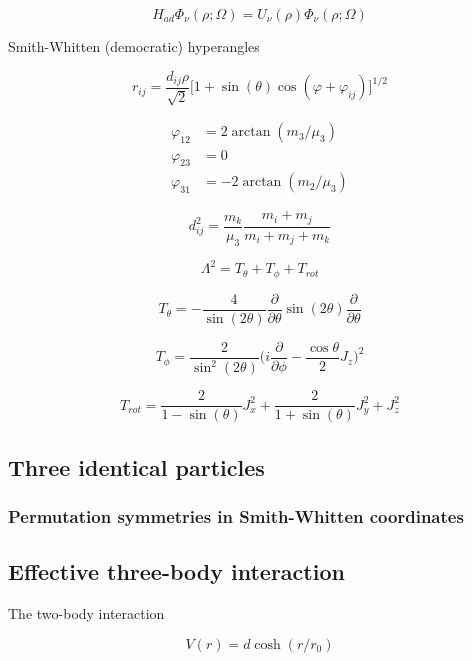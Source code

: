 \documentclass{article}
\begin{document}
\begin{equation}
H_{ad} \Phi_{\nu}{(\rho ; \Omega)}= U_{\nu}{(\rho)} \Phi_{\nu}{(\rho ; \Omega)}
\end{equation}


Smith-Whitten (democratic) hyperangles

\begin{equation}
r_{ij} = \frac{d_{ij} \rho}{\sqrt{2}} \Big[1+\sin(\theta) \cos{(\varphi + \varphi_{ij})}\Big]^{1/2}
\end{equation}

\begin{align*}
\varphi_{12} &= 2 \arctan{(m_{3} / \mu_{3})} \\
\varphi_{23} &= 0 \\
\varphi_{31} &= -2 \arctan{(m_{2} / \mu_{3})}
\end{align*}

\begin{equation}
d_{ij}^{2} =  \frac{m_{k}}{\mu_{3}} \frac{m_{i} + m_{j}}{m_{i} + m_{j} + m_{k}}
\end{equation}

\begin{equation}
\Lambda^2 = T_{\theta} + T_{\phi} + T_{rot}  
\end{equation}

\begin{equation}
T_{\theta} = -\frac{4}{\sin(2\theta)} \frac{\partial}{\partial \theta} \sin(2\theta) \frac{\partial}{\partial \theta}
\end{equation}

\begin{equation}
T_{\phi} = \frac{2}{\sin^2{(2 \theta)}} \Big( i \frac{\partial}{\partial \phi} - \frac{\cos{\theta}}{2} J_{z}\Big)^2  
\end{equation}

\begin{equation}
T_{rot} = \frac{2}{1-\sin(\theta)} J_{x}^{2} + \frac{2}{1+\sin(\theta)} J_{y}^{2} + J_{z}^{2}  
\end{equation}

\subsection{Three identical particles}
\subsubsection{Permutation symmetries in Smith-Whitten coordinates}

\subsection{Effective three-body interaction}
The two-body interaction 

\begin{equation}
V(r) = d\cosh{(r/r_0)}
\end{equation}
\end{document}
